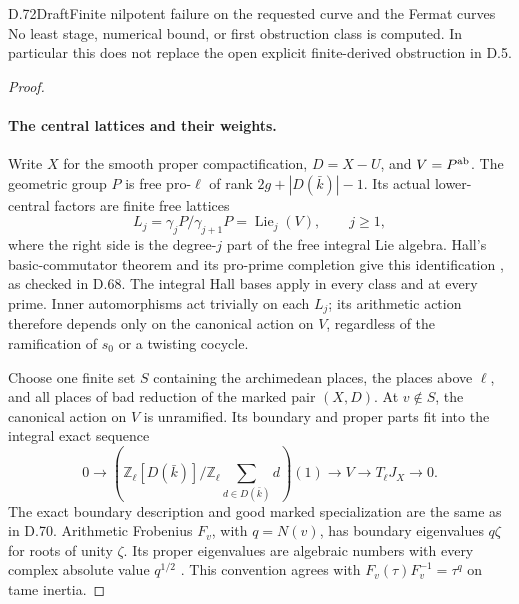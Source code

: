 \begin{statement}{D.72}{Draft}{Finite nilpotent failure on the requested curve and the Fermat curves}
No least stage, numerical bound, or first obstruction class is
computed. In particular this does not replace the open explicit
finite-derived obstruction in D.5.
\end{statement}

\begin{proof}
\paragraph{The central lattices and their weights.}
Write \(X\) for the smooth proper compactification, \(D=X-U\),
and \(V=P^{\rm ab}\). The geometric group \(P\) is free
pro-\(\ell\) of rank \(2g+|D(\bar k)|-1\). Its actual
lower-central factors are finite free lattices
\[
 L_j=\gamma_jP/\gamma_{j+1}P
       =\operatorname{Lie}_j(V),\qquad j\ge1,            \tag{D.72.5}
\]
where the right side is the degree-\(j\) part of the free
integral Lie algebra. Hall's basic-commutator theorem and
its pro-prime completion give this identification
\cite[Theorems 5.6 and 6.5, and completion case (iii)]{DE_HallEdmonton},
as checked in D.68. The integral Hall bases apply in every
class and at every prime. Inner automorphisms act trivially
on each \(L_j\); its arithmetic action therefore depends
only on the canonical action on \(V\), regardless of the
ramification of \(s_0\) or a twisting cocycle.

Choose one finite set \(S\) containing the archimedean places,
the places above \(\ell\), and all places of bad reduction
of the marked pair \((X,D)\). At \(v\notin S\), the
canonical action on \(V\) is unramified. Its boundary and
proper parts fit into the integral exact sequence
\[
 0\longrightarrow
 \left(\mathbb Z_\ell[D(\bar k)]/
                   \mathbb Z_\ell{\textstyle\sum_{d\in D(\bar k)}}d\right)(1)
 \longrightarrow V\longrightarrow T_\ell J_X
 \longrightarrow0.                                    \tag{D.72.6}
\]
The exact boundary description and good marked specialization
are the same as in D.70. Arithmetic Frobenius \(F_v\), with
\(q=N(v)\), has boundary eigenvalues \(q\zeta\) for roots
of unity \(\zeta\). Its proper eigenvalues are algebraic
numbers with every complex absolute value \(q^{1/2}\)
\cite[II, Theorem 1.1; IV, Section 3]{fghMilneAV2008}.
This convention agrees with \(F_v(\tau)F_v^{-1}=\tau^q\)
on tame inertia.


\end{proof}
